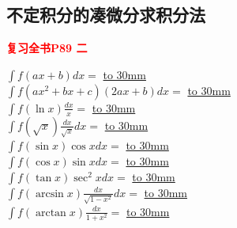 \documentclass[a4paper]{ctexart}
\begin{document}
\subsection{不定积分的凑微分求积分法}
    \textcolor{red}{\textbf{复习全书P89 \quad 二}}
\begin{multicols}{2}
$\int { f(ax+b)dx= } $
    \underline{\hbox to 30mm{}} \\
    $\int{f(ax^2 + bx +c)(2ax + b)dx}=$
    \underline{\hbox to 30mm{}} \\
    $\int{f(\ln{x})\frac{dx}{x}}=$
    \underline{\hbox to 30mm{}} \\
    $\int{f(\sqrt{x})\frac{dx}{\sqrt{x}}dx}=$
    \underline{\hbox to 30mm{}} \\
    $\int{f(\sin{x})\cos{x}dx}=$
    \underline{\hbox to 30mm{}} \\
    $\int{f(\cos{x})\sin{x}dx}=$
    \underline{\hbox to 30mm{}} \\
    $\int{f(\tan{x})\sec^2{x}dx}=$
    \underline{\hbox to 30mm{}} \\
    $\int{f(\arcsin{x})\frac{dx}{\sqrt{1-x^2}}dx}=$
    \underline{\hbox to 30mm{}} \\
    $\int{f(\arctan{x})\frac{dx}{1+x^2}}=$
    \underline{\hbox to 30mm{}} \\
\end{multicols}
\end{document}
